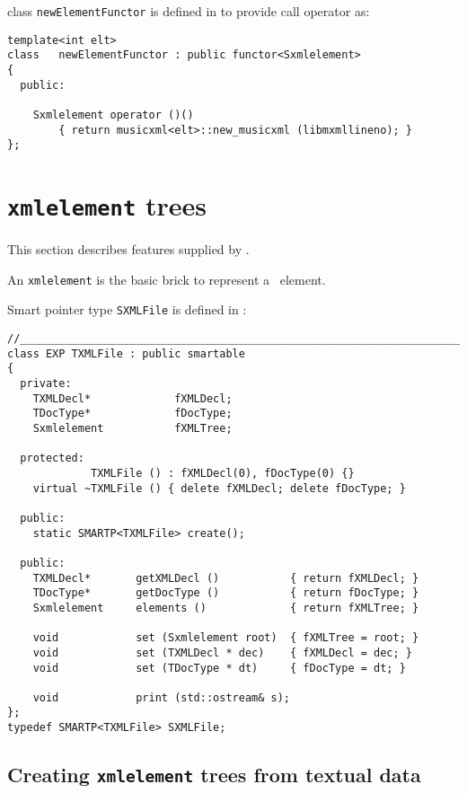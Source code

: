 class   {\tt newElementFunctor} is defined in {\tt } to provide call operator as:
\begin{lstlisting}[language=CPlusPlus]
template<int elt>
class   newElementFunctor : public functor<Sxmlelement>
{
  public:

    Sxmlelement operator ()()
        { return musicxml<elt>::new_musicxml (libmxmllineno); }
};
\end{lstlisting}


\section{{\tt xmlelement} trees}

This section describes features supplied by \libmusicxml.

An {\tt xmlelement} is the basic brick to represent a \mxml\ element.

Smart pointer type {\tt SXMLFile} is defined in :
\begin{lstlisting}[language=CPlusPlus]
//______________________________________________________________________________
class EXP TXMLFile : public smartable
{
  private:
    TXMLDecl*             fXMLDecl;
    TDocType*             fDocType;
    Sxmlelement           fXMLTree;

  protected:
			 TXMLFile () : fXMLDecl(0), fDocType(0) {}
    virtual ~TXMLFile () { delete fXMLDecl; delete fDocType; }

  public:
    static SMARTP<TXMLFile> create();

  public:
    TXMLDecl* 		getXMLDecl ()			{ return fXMLDecl; }
    TDocType* 		getDocType ()			{ return fDocType; }
    Sxmlelement		elements () 			{ return fXMLTree; }

    void 			set (Sxmlelement root)	{ fXMLTree = root; }
    void 			set (TXMLDecl * dec)	{ fXMLDecl = dec; }
    void 			set (TDocType * dt)		{ fDocType = dt; }

    void 			print (std::ostream& s);
};
typedef SMARTP<TXMLFile> SXMLFile;
\end{lstlisting}


	\subsection{Creating {\tt xmlelement} trees from textual data}

